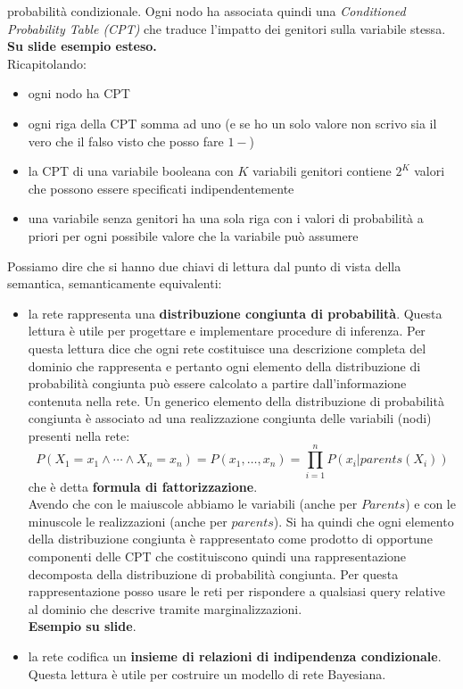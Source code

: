\documentclass[a4paper,12pt, oneside]{book}
\begin{document}
probabilità condizionale. Ogni nodo ha associata quindi una \textit{Conditioned
  Probability Table (\textit{CPT})} che traduce l'impatto dei genitori sulla
variabile stessa.\\
\textbf{Su slide esempio esteso.}\\
Ricapitolando:
\begin{itemize}
  \item ogni nodo ha CPT
  \item ogni riga della CPT somma ad uno (e se ho un solo valore non scrivo sia
  il vero che il falso visto che posso fare $1-$)
  \item la CPT di una variabile booleana con $K$ variabili genitori contiene
  $2^K$ valori che possono essere specificati indipendentemente
  \item una variabile senza genitori ha una sola riga con i valori di
  probabilità a priori per ogni possibile valore che la variabile può assumere 
\end{itemize}
Possiamo dire che si hanno due chiavi di lettura dal punto di vista della
semantica, semanticamente equivalenti: 
\begin{itemize}
  \item la rete rappresenta una \textbf{distribuzione congiunta di
    probabilità}. Questa 
  lettura è utile per progettare e implementare procedure di inferenza. Per
  questa lettura dice che ogni rete costituisce una descrizione completa del
  dominio che rappresenta e pertanto ogni elemento della distribuzione di
  probabilità congiunta può essere calcolato a partire dall’informazione
  contenuta nella rete. Un generico elemento della distribuzione di probabilità
  congiunta è associato ad una realizzazione congiunta delle variabili (nodi)
  presenti nella rete:
  \[P(X_1=x_1\land\cdots\land X_n=x_n)=P(x_1,\ldots
    ,x_n)=\prod_{i=1}^nP(x_i|parents(X_i))\]
  che è detta \textbf{formula di fattorizzazione}.\\
  Avendo che con le maiuscole abbiamo le variabili (anche per $Parents$) e con
  le minuscole le realizzazioni (anche per $parents$). Si ha quindi che ogni
  elemento della distribuzione congiunta è rappresentato come prodotto di
  opportune componenti delle CPT che costituiscono quindi una rappresentazione
  decomposta della distribuzione di probabilità congiunta. Per questa
  rappresentazione posso usare le reti per rispondere a qualsiasi query relative
  al dominio che descrive tramite marginalizzazioni.\\
  \textbf{Esempio su slide}.
  
  \item la rete codifica un \textbf{insieme di relazioni di indipendenza
    condizionale}. Questa lettura è utile per costruire un modello di rete
  Bayesiana.
\end{itemize}
\end{document}
